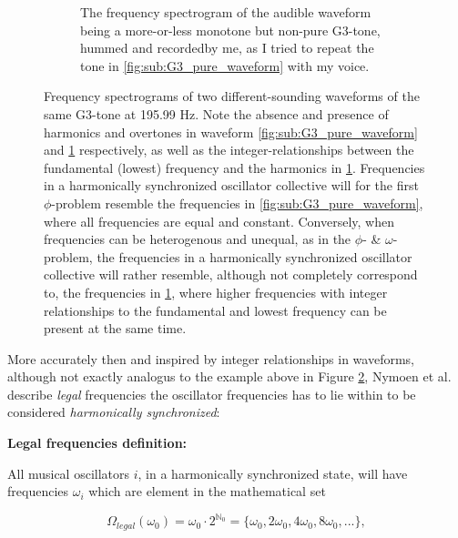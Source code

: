 \begin{figure}[ht!]
\begin{subfigure}[t]{.5\textwidth}
		\caption{The frequency spectrogram of the audible waveform being a more-or-less monotone but non-pure G3-tone, hummed and recorded\protect\footnotemark  by me, as I tried to repeat the tone in \ref{fig:sub:G3_pure_waveform} with my voice.}
		\label{fig:sub:G3_hummed_waveform}
	\end{subfigure}
	\caption[Frequency spectrograms illustrating the absence and presence of harmonics and overtones in audible waveforms]{Frequency spectrograms of two different-sounding waveforms of the same G3-tone at 195.99 Hz. Note the absence and presence of harmonics and overtones in waveform \ref{fig:sub:G3_pure_waveform} and \ref{fig:sub:G3_hummed_waveform} respectively, as well as the integer-relationships between the fundamental (lowest) frequency and the harmonics in \ref{fig:sub:G3_hummed_waveform}. Frequencies in a harmonically synchronized oscillator collective will for the first $\phi$-problem resemble the frequencies in \ref{fig:sub:G3_pure_waveform}, where all frequencies are equal and constant. Conversely, when frequencies can be heterogenous and unequal, as in the $\phi$- \& $\omega$-problem, the frequencies in a harmonically synchronized oscillator collective will rather resemble, although not completely correspond to, the frequencies in \ref{fig:sub:G3_hummed_waveform}, where higher frequencies with integer relationships to the fundamental and lowest frequency can be present at the same time.}
	\label{fig:frequency_spectrograms}
\end{figure}

\addtocounter{footnote}{-2} %


More accurately then and inspired by integer relationships in waveforms, although not exactly analogus to the example above in Figure \ref{fig:frequency_spectrograms}, Nymoen et al. describe \textit{legal} frequencies the oscillator frequencies has to lie within to be considered \textit{harmonically synchronized}: \nl

\textbf{Legal frequencies definition:} \nl

All musical oscillators $i$, in a harmonically synchronized state, will have frequencies $\omega_i$ which are element in the mathematical set

\begin{equation}\label{legal_freqs}
\Omega_{legal}(\omega_0) = \omega_{0} \cdot 2^{\mathbb{N}_0} = \{\omega_{0}, 2\omega_{0}, 4\omega_{0}, 8\omega_{0}, ...\} ,
\end{equation}

